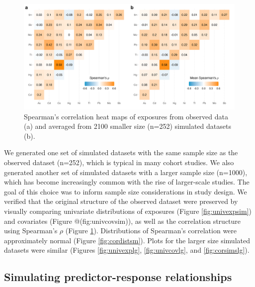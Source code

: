 \documentclass[12pt, twoside]{amherstthesis}
\begin{document}
\begin{figure}

{\centering \includegraphics[width=1\linewidth]{figures/ch4_corr_sim+orig} 

}

\caption{Spearman's correlation heat maps of exposures from observed data (a) and averaged from 2100 smaller size (n=252) simulated datasets (b).}\label{fig:corsimssm}
\end{figure}
We generated one set of simulated datasets with the same sample size as the observed dataset (n=252), which is typical in many cohort studies. We also generated another set of simulated datasets with a larger sample size (n=1000), which has become increasingly common with the rise of larger-scale studies. The goal of this choice was to inform sample size considerations in study design. We verified that the original structure of the observed dataset were preserved by visually comparing univariate distributions of exposures (Figure \ref{fig:univexpsim}) and covariates (Figure @(fig:univcovsim)), as well as the correlation structure using Spearman's \(\rho\) (Figure \ref{fig:corsimssm}). Distributions of Spearman's correlation were approximately normal (Figure \ref{fig:cordistsm}). Plots for the larger size simulated datasets were similar (Figures \ref{fig:univexplg}, \ref{fig:univcovlg}, and \ref{fig:corsimslg}).

\hypertarget{simresp}{%
\subsection{Simulating predictor-response relationships}\label{simresp}}
\end{document}
